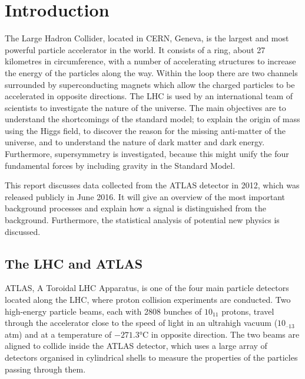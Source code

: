\documentclass[runningheads,a4paper]{llncs}
\begin{document}

\section{Introduction}

The Large Hadron Collider, located in CERN, Geneva, is the largest and most powerful particle accelerator in the world. It consists of a ring, about 27 kilometres in circumference, with a number of accelerating structures to increase the energy of the particles along the way. Within the loop there are two channels surrounded by superconducting magnets which allow the charged particles to be accelerated in opposite directions. The LHC is used by an international team of scientists to investigate the nature of the universe. The main objectives are to understand the shortcomings of the standard model; to explain the origin of mass using the Higgs field, to discover the reason for the missing anti-matter of the universe, and to understand the nature of dark matter and dark energy. Furthermore, supersymmetry is investigated, because this might unify the four fundamental forces by including gravity in the Standard Model.

This report discusses data collected from the ATLAS detector in 2012, which was released publicly in June 2016. It will give an overview of the most important background processes and explain how a signal is distinguished from the background. Furthermore, the statistical analysis of potential new physics is discussed.

\subsection{The LHC and ATLAS}

ATLAS, A Toroidal LHC Apparatus, is one of the four main particle detectors located along the LHC, where proton collision experiments are conducted. Two high-energy particle beams, each with 2808 bunches of ${10}_{11}$ protons, travel through the accelerator close to the speed of light in an ultrahigh vacuum (${10}_{–13}$ atm) and at a temperature of $-271.3$°C in opposite direction. The two beams are aligned to collide inside the ATLAS detector, which uses a large array of detectors organised in cylindrical shells to measure the properties of the particles passing through them. 
\end{document}
